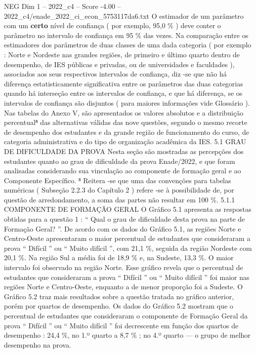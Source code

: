 \begin{textsample}{NEG Dim 1 – 2022\_c4 – Score -4.00 – 2022\_c4/enade\_2022\_ci\_econ\_5753117da6.txt}
O estimador de um parâmetro com um \textbf{certo} nível de confiança ( por exemplo, 95,0 \% ) deve conter o parâmetro no intervalo de confiança em 95 \% das vezes.
Na comparação entre os estimadores dos parâmetros de duas classes de uma dada categoria ( por exemplo : Norte e Nordeste nas grandes regiões, de primeiro e último quarto dentro de desempenho, de IES públicas e privadas, ou de universidades e faculdades ), associados aos seus respectivos intervalos de confiança, diz -se que não há diferença estatisticamente significativa entre os parâmetros das duas categorias quando há interseção entre os intervalos de confiança, e que há diferença, se os intervalos de confiança são disjuntos ( para maiores informações vide Glossário ).
Nas tabelas do Anexo V, são apresentados os valores absolutos e a distribuição percentual⁸ das alternativas válidas das nove questões, segundo o mesmo recorte de desempenho dos estudantes e da grande região de funcionamento do curso, de categoria administrativa e do tipo de organização acadêmica da IES. 5.1 GRAU DE DIFICULDADE DA PROVA Nesta seção são mostradas as percepções dos estudantes quanto ao grau de dificuldade da prova Enade/2022, e que foram analisadas considerando sua vinculação ao componente de formação geral e ao Componente Específico. ⁸ Reitera -se que uma das convenções para tabelas numéricas ( Subseção 2.2.3 do Capítulo 2 ) refere -se à possibilidade de, por questão de arredondamento, a soma das partes não resultar em 100 \%. 5.1.1 COMPONENTE DE FORMAÇÃO GERAL O Gráfico 5.1 apresenta as respostas obtidas para a questão 1 : “ Qual o grau de dificuldade desta prova na parte de Formação Geral? ”.
De acordo com os dados do Gráfico 5.1, as regiões Norte e Centro-Oeste apresentaram o maior percentual de estudantes que consideraram a prova “ Difícil ” ou “ Muito difícil ”, com 21,1 \%, seguida da região Nordeste com 20,1 \%.
Na região Sul a média foi de 18,9 \% e, na Sudeste, 13,3 \%.
O maior intervalo foi observado na região Norte.
Esse gráfico revela que o percentual de estudantes que consideraram a prova “ Difícil ” ou “ Muito difícil ” foi maior nas regiões Norte e Centro-Oeste, enquanto a de menor proporção foi a Sudeste.
O Gráfico 5.2 traz mais resultados sobre a questão tratada no gráfico anterior, porém por quartos de desempenho.
Os dados do Gráfico 5.2 mostram que o percentual de estudantes que consideraram o componente de Formação Geral da prova “ Difícil ” ou “ Muito difícil ” foi decrescente em função dos quartos de desempenho : 24,4 \%, no 1.º quarto a 8,7 \% ; no 4.º quarto — o grupo de melhor desempenho na prova.

\end{textsample}
